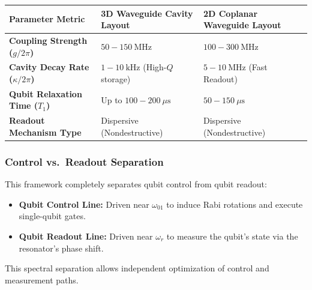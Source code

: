 \documentclass[
]{article}
\providecommand{\tightlist}{%
  \setlength{\itemsep}{0pt}\setlength{\parskip}{0pt}}
\begin{document}
\begin{longtable}[]{@{}
  >{\raggedright\arraybackslash}p{}
  >{\raggedright\arraybackslash}p{}
  >{\raggedright\arraybackslash}p{}@{}}
\toprule\noalign{}
\begin{minipage}[b]{\linewidth}\raggedright
Parameter Metric
\end{minipage} & \begin{minipage}[b]{\linewidth}\raggedright
3D Waveguide Cavity Layout
\end{minipage} & \begin{minipage}[b]{\linewidth}\raggedright
2D Coplanar Waveguide Layout
\end{minipage} \\
\midrule\noalign{}
\endhead
\bottomrule\noalign{}
\endlastfoot
\textbf{Coupling Strength (\(g/2\pi\))} & \(50 - 150\ \text{MHz}\) &
\(100 - 300\ \text{MHz}\) \\
\textbf{Cavity Decay Rate (\(\kappa/2\pi\))} & \(1 - 10\ \text{kHz}\)
(High-\(Q\) storage) & \(5 - 10\ \text{MHz}\) (Fast Readout) \\
\textbf{Qubit Relaxation Time (\(T_1\))} & Up to
\(100 - 200\ \mu\text{s}\) & \(50 - 150\ \mu\text{s}\) \\
\textbf{Readout Mechanism Type} & Dispersive (Nondestructive) &
Dispersive (Nondestructive) \\
\end{longtable}

\subsubsection{Control vs.~Readout
Separation}\label{control-vs.-readout-separation}

This framework completely separates qubit control from qubit readout:

\begin{itemize}
\tightlist
\item
  \textbf{Qubit Control Line:} Driven near \(\omega_{01}\) to induce
  Rabi rotations and execute single-qubit gates.
\item
  \textbf{Qubit Readout Line:} Driven near \(\omega_r\) to measure the
  qubit's state via the resonator's phase shift.
\end{itemize}

This spectral separation allows independent optimization of control and
measurement paths.
\end{document}

